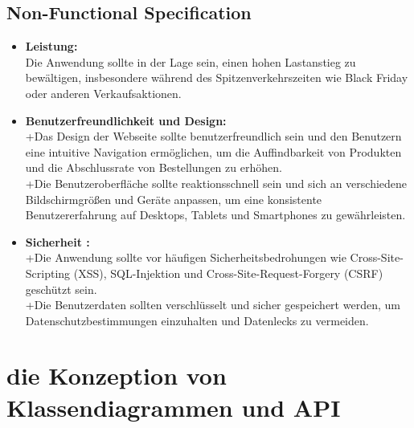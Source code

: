 	\section{Non-Functional Specification}
	\begin{itemize}
			\item \textbf{Leistung:}\\
			Die Anwendung sollte in der Lage sein, einen hohen Lastanstieg zu bewältigen, insbesondere während des Spitzenverkehrszeiten wie Black Friday oder anderen Verkaufsaktionen.
			\item \textbf{Benutzerfreundlichkeit und Design:}\\
			+Das Design der Webseite sollte benutzerfreundlich sein und den Benutzern eine intuitive Navigation ermöglichen, um die Auffindbarkeit von Produkten und die Abschlussrate von Bestellungen zu erhöhen.\\
			+Die Benutzeroberfläche sollte reaktionsschnell sein und sich an verschiedene Bildschirmgrößen und Geräte anpassen, um eine konsistente Benutzererfahrung auf Desktops, Tablets und Smartphones zu gewährleisten.
			\item \textbf{Sicherheit :}\\
			+Die Anwendung sollte vor häufigen Sicherheitsbedrohungen wie Cross-Site-Scripting (XSS), SQL-Injektion und Cross-Site-Request-Forgery (CSRF) geschützt sein.\\
			+Die Benutzerdaten sollten verschlüsselt und sicher gespeichert werden, um Datenschutzbestimmungen einzuhalten und Datenlecks zu vermeiden.
	\end{itemize}
\chapter{die Konzeption von Klassendiagrammen und API}
